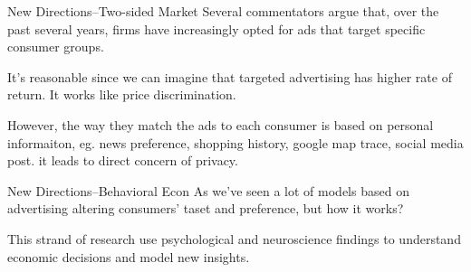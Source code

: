 \documentclass[10pt]{beamer}
\begin{document}
\begin{frame}{New Directions--Two-sided Market}
Several commentators argue that, over the past several years, firms have increasingly opted for ads that target specific consumer groups.

It's reasonable since we can imagine that targeted advertising has higher rate of return. It works like price discrimination.

However, the way they match the ads to each consumer is based on personal informaiton, eg. news preference, shopping history, google map trace, social media post. it leads to direct concern of privacy.
\end{frame}

\begin{frame}{New Directions--Behavioral Econ}
As we've seen a lot of models based on advertising altering consumers' taset and preference, but how it works?

This strand of research use psychological and neuroscience findings to understand economic decisions and model new insights.
    
\end{frame}
\end{document}
